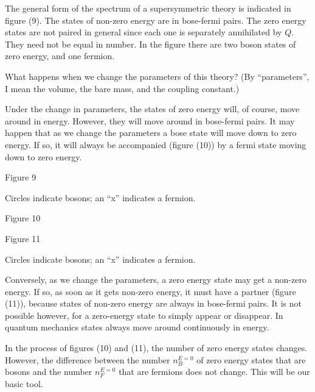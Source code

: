 \documentclass[11pt,a4paper]{article}
\newcommand{\asteriskfootnotemark}{\footnotemark[1]}
\begin{document}
The general form of the spectrum of a supersymmetric theory is
indicated in figure (9). The states of non-zero energy are in bose-fermi
pairs. The zero energy states are not paired in general since
each one is separately annihilated by $Q$. They need not be equal in
number. In the figure there are two boson states of zero energy,
and one fermion.

What happens when we change the parameters of this theory?
(By ``parameters'', I mean the volume,
the bare mass, and the coupling
constant.)

Under the change in parameters,
the states of zero energy will, of
course, move around in energy.
However, they will move around in
bose-fermi pairs. It may happen
that as we change the parameters a
bose state will move down to zero
energy. If so, it will always be
accompanied (figure (10)) by a
fermi state moving down to zero
energy.

\begin{center}

\par\smallskip
Figure 9
\par\smallskip
Circles indicate bosons; an ``x'' indicates a fermion.
\end{center}

\begin{center}

\par\smallskip
Figure 10
\end{center}

\begin{center}

\par\smallskip
Figure 11
\par\smallskip
Circles indicate bosons; an ``x'' indicates a fermion.
\end{center}

Conversely, as we change the parameters, a zero energy
state may get a non-zero energy. If so, as soon as it gets non-zero
energy, it must have a partner (figure (11)), because states
of non-zero energy are always in bose-fermi pairs. It is not possible
however, for a zero-energy state to simply appear or disappear.
In quantum mechanics states always move around continuously in
energy.\asteriskfootnotemark

In the process of figures (10) and (11), the number of zero
energy states changes. However, the difference between the number
$n_B^{E=0}$ of zero energy states that are bosons and the number $n_F^{E=0}$
that are fermions does not change. This will be our basic tool.
\end{document}
